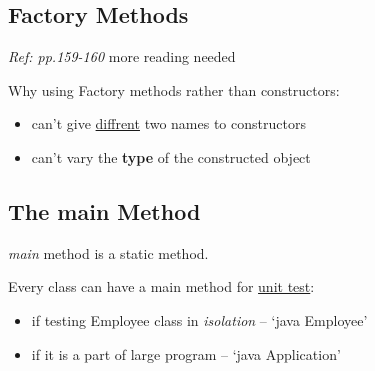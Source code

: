 \documentclass[12pt]{article}
\begin{document}
\subsection{Factory Methods}
\textit{Ref: pp.159-160} more reading needed

Why using Factory methods rather than constructors:
\begin{itemize}
    \item can't give \underline{diffrent} two names to constructors
    \item can't vary the \textbf{type} of the constructed object
\end{itemize}

\subsection{The main Method}
\emph{main} method is a static method.

Every class can have a main method for \underline{unit test}:
\begin{itemize}
    \item if testing Employee class in \textit{isolation} -- `java Employee'
    \item if it is a part of large program -- `java Application'
\end{itemize}
\end{document}
